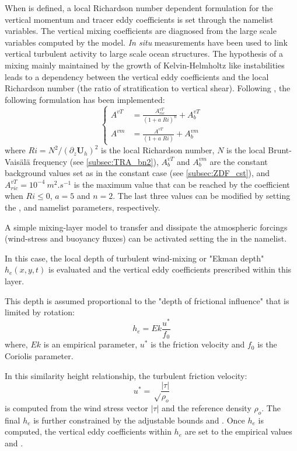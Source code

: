 \documentclass[../main/NEMO_manual]{subfiles}
\begin{document}
When  is defined, a local Richardson number dependent formulation for the vertical momentum and
tracer eddy coefficients is set through the  namelist variables.
The vertical mixing coefficients are diagnosed from the large scale variables computed by the model. 
\textit{In situ} measurements have been used to link vertical turbulent activity to large scale ocean structures.
The hypothesis of a mixing mainly maintained by the growth of Kelvin-Helmholtz like instabilities leads to
a dependency between the vertical eddy coefficients and the local Richardson number
(\ie the ratio of stratification to vertical shear).
Following \citet{Pacanowski_Philander_JPO81}, the following formulation has been implemented:
\[
  \left\{
    \begin{aligned}
      A^{vT} &= \frac {A_{ric}^{vT}}{\left( 1+a \; Ri \right)^n} + A_b^{vT}       \\
      A^{vm} &= \frac{A^{vT}        }{\left( 1+ a \;Ri  \right)   } + A_b^{vm}
    \end{aligned}
  \right.
\]
where $Ri = N^2 / \left(\partial_z \textbf{U}_h \right)^2$ is the local Richardson number,
$N$ is the local Brunt-Vais\"{a}l\"{a} frequency (see \autoref{subsec:TRA_bn2}), 
$A_b^{vT} $ and $A_b^{vm}$ are the constant background values set as in the constant case
(see \autoref{subsec:ZDF_cst}), and $A_{ric}^{vT} = 10^{-4}~m^2.s^{-1}$ is the maximum value that
can be reached by the coefficient when $Ri\leq 0$, $a=5$ and $n=2$.
The last three values can be modified by setting the ,  and
 namelist parameters, respectively.

A simple mixing-layer model to transfer and dissipate the atmospheric forcings
(wind-stress and buoyancy fluxes) can be activated setting the  in the namelist.

In this case, the local depth of turbulent wind-mixing or "Ekman depth" $h_{e}(x,y,t)$ is evaluated and
the vertical eddy coefficients prescribed within this layer.

This depth is assumed proportional to the "depth of frictional influence" that is limited by rotation:
\[
  h_{e} = Ek \frac {u^{*}} {f_{0}}
\]
where, $Ek$ is an empirical parameter, $u^{*}$ is the friction velocity and $f_{0}$ is the Coriolis parameter.

In this similarity height relationship, the turbulent friction velocity:
\[
  u^{*} = \sqrt \frac {|\tau|} {\rho_o}
\]
is computed from the wind stress vector $|\tau|$ and the reference density $ \rho_o$.
The final $h_{e}$ is further constrained by the adjustable bounds  and .
Once $h_{e}$ is computed, the vertical eddy coefficients within $h_{e}$ are set to
the empirical values  and  \citep{Lermusiaux2001}.
\end{document}
